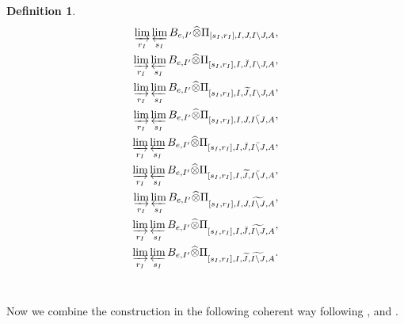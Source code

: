 \documentclass[12pt]{amsart}
\theoremstyle{definition}
\newtheorem{definition}[theorem]{Definition}
\numberwithin{equation}{section}
\begin{document}
\begin{definition}
\begin{align}
\varinjlim_{r_I}\varprojlim_{s_I} B_{e,I'}	\widehat{\otimes}\Pi_{[s_I,r_I],I,J,I\backslash J,A},\\	
\varinjlim_{r_I}\varprojlim_{s_I} B_{e,I'}	\widehat{\otimes}\Pi_{[s_I,r_I],I,\breve{J},I\backslash J,A},\\	
\varinjlim_{r_I}\varprojlim_{s_I} B_{e,I'}	\widehat{\otimes}\Pi_{[s_I,r_I],I,\widetilde{J},I\backslash J,A},\\
\varinjlim_{r_I}\varprojlim_{s_I} B_{e,I'}	\widehat{\otimes}\Pi_{[s_I,r_I],I,J,\breve{I\backslash J},A},\\	
\varinjlim_{r_I}\varprojlim_{s_I} B_{e,I'}	\widehat{\otimes}\Pi_{[s_I,r_I],I,\breve{J},\breve{I\backslash J},A},\\
\varinjlim_{r_I}\varprojlim_{s_I} B_{e,I'}	\widehat{\otimes}\Pi_{[s_I,r_I],I,\widetilde{J},\breve{I\backslash J},A},\\
\varinjlim_{r_I}\varprojlim_{s_I} B_{e,I'}	\widehat{\otimes}\Pi_{[s_I,r_I],I,J,\widetilde{I\backslash J},A},\\	
\varinjlim_{r_I}\varprojlim_{s_I} B_{e,I'}	\widehat{\otimes}\Pi_{[s_I,r_I],I,\breve{J},\widetilde{I\backslash J},A},\\
\varinjlim_{r_I}\varprojlim_{s_I} B_{e,I'} \widehat{\otimes}\Pi_{[s_I,r_I],I,\widetilde{J},\widetilde{I\backslash J},A}.
\end{align}\\
	
\end{definition}


\indent Now we combine the construction in the following coherent way following \cite[Section 2]{Ber1}, \cite[Definition 2.2]{Nak1} and \cite[Definition 2.2.6]{KPX}.
\end{document}
